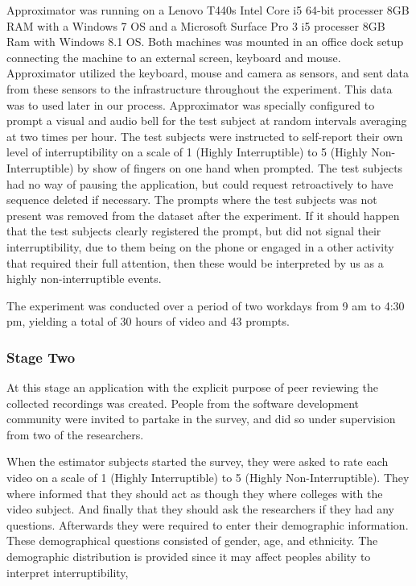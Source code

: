 \documentclass{sigchi}
\begin{document}
Approximator was running on a Lenovo T440s Intel Core i5 64-bit processer 8GB RAM with a Windows 7 OS and a Microsoft Surface Pro 3 i5 processer 8GB Ram with Windows 8.1 OS.
Both machines was mounted in an office dock setup connecting the machine to an external screen, keyboard and mouse.
Approximator utilized the keyboard, mouse and camera as sensors, and sent data from these sensors to the infrastructure throughout the experiment.
This data was to used later in our process.
Approximator was specially configured to prompt a visual and audio bell for the test subject at random intervals averaging at two times per hour.
The test subjects were instructed to self-report their own level of interruptibility on a scale of 1 (Highly Interruptible) to 5 (Highly Non-Interruptible) by show of fingers on one hand when prompted.
The test subjects had no way of pausing the application, but could request retroactively to have sequence deleted if necessary.
The prompts where the test subjects was not present was removed from the dataset after the experiment.
If it should happen that the test subjects clearly registered the prompt, but did not signal their interruptibility, due to them being on the phone or engaged in a other activity that required their full attention, then these would be interpreted by us as a highly non-interruptible events.

The experiment was conducted over a period of two workdays from 9 am to 4:30 pm, yielding a total of 30 hours of video and 43 prompts.

\subsubsection{Stage Two}
\label{stage_two}
At this stage an application with the explicit purpose of peer reviewing the collected recordings was created.
People from the software development community were invited to partake in the survey, and did so under supervision from two of the researchers.

When the estimator subjects started the survey, they were asked to rate each video on a scale of 1 (Highly Interruptible) to 5 (Highly Non-Interruptible).
They where informed that they should act as though they where colleges with the video subject.
And finally that they should ask the researchers if they had any questions.
Afterwards they were required to enter their demographic information.
These demographical questions consisted of gender, age, and ethnicity.
The demographic distribution is provided since it may affect peoples ability to interpret interruptibility,
\end{document}
